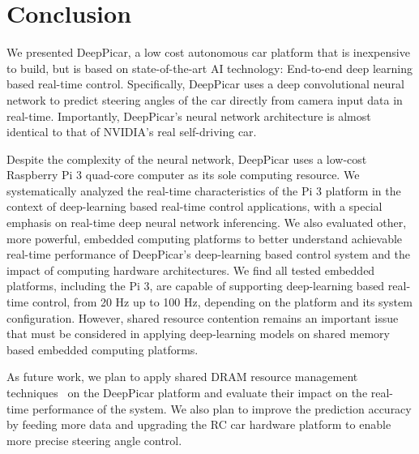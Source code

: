 \section{Conclusion}\label{sec:conclusion}
We presented DeepPicar, a low cost autonomous car platform that is
inexpensive to build, but is based on state-of-the-art AI technology:
End-to-end deep learning based real-time control.
Specifically, DeepPicar uses a deep convolutional neural network to
predict steering angles of the car directly from camera input data
in real-time. Importantly, DeepPicar's neural network architecture is
almost identical to that of NVIDIA's real self-driving car. 

Despite the complexity of the neural network, DeepPicar uses a
low-cost Raspberry Pi 3 quad-core computer as its sole computing
resource. We systematically analyzed the real-time characteristics of
the Pi 3 platform in the context of deep-learning based real-time
control applications, with a special emphasis on real-time deep neural
network inferencing.
We also evaluated other, more powerful, embedded computing
platforms to better understand achievable real-time performance of
DeepPicar's deep-learning based control system and the impact of
computing hardware architectures.
We find all tested embedded platforms, including the Pi 3, are capable
of supporting deep-learning based real-time control, from 20 Hz up to
100 Hz, depending on the platform and its system
configuration. However, shared resource contention remains an
important issue that must be considered in applying deep-learning
models on shared memory based embedded computing platforms.

As future work, we plan to apply shared DRAM resource management
techniques~\cite{Yun2013,yun2014rtas} on the DeepPicar platform and
evaluate their impact on the real-time performance of the system. We
also plan to improve the prediction accuracy by feeding more data and
upgrading the RC car hardware platform to enable more precise steering
angle control.